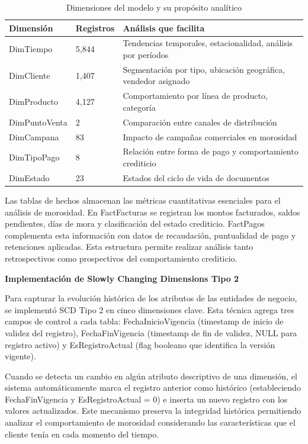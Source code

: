 \begin{table}[ht]
\centering
\begin{tabular}{|p{3cm}|p{4cm}|p{7.5cm}|}
\hline
\textbf{Dimensión} & \textbf{Registros} & \textbf{Análisis que facilita} \\
\hline
DimTiempo & 5,844 & Tendencias temporales, estacionalidad, análisis por períodos \\
\hline
DimCliente & 1,407 & Segmentación por tipo, ubicación geográfica, vendedor asignado \\
\hline
DimProducto & 4,127 & Comportamiento por línea de producto, categoría \\
\hline
DimPuntoVenta & 2 & Comparación entre canales de distribución \\
\hline
DimCampana & 83 & Impacto de campañas comerciales en morosidad \\
\hline
DimTipoPago & 8 & Relación entre forma de pago y comportamiento crediticio \\
\hline
DimEstado & 23 & Estados del ciclo de vida de documentos \\
\hline
\end{tabular}
\caption{Dimensiones del modelo y su propósito analítico}
\end{table}

Las tablas de hechos almacenan las métricas cuantitativas esenciales para el análisis de morosidad. En FactFacturas se registran los montos facturados, saldos pendientes, días de mora y clasificación del estado crediticio. FactPagos complementa esta información con datos de recaudación, puntualidad de pago y retenciones aplicadas. Esta estructura permite realizar análisis tanto retrospectivos como prospectivos del comportamiento crediticio.

\textbf{Implementación de Slowly Changing Dimensions Tipo 2}

Para capturar la evolución histórica de los atributos de las entidades de negocio, se implementó SCD Tipo 2 en cinco dimensiones clave. Esta técnica agrega tres campos de control a cada tabla: FechaInicioVigencia (timestamp de inicio de validez del registro), FechaFinVigencia (timestamp de fin de validez, NULL para registro activo) y EsRegistroActual (flag booleano que identifica la versión vigente).

Cuando se detecta un cambio en algún atributo descriptivo de una dimensión, el sistema automáticamente marca el registro anterior como histórico (estableciendo FechaFinVigencia y EsRegistroActual = 0) e inserta un nuevo registro con los valores actualizados. Este mecanismo preserva la integridad histórica permitiendo analizar el comportamiento de morosidad considerando las características que el cliente tenía en cada momento del tiempo.

